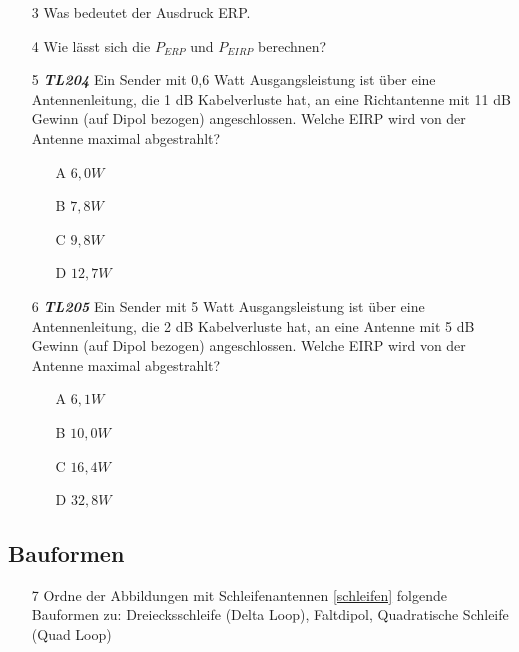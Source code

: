 \begin{enumerate} 
	\item[3] Was bedeutet der Ausdruck ERP.
	\item[4] Wie lässt sich die $P_{ERP}$ und $P_{EIRP}$ berechnen?
	\item[5] \emph{\textbf{TL204}}  Ein Sender mit 0,6 Watt Ausgangsleistung ist über eine Antennenleitung, die 1 dB Kabelverluste hat, an eine Richtantenne mit 11 dB Gewinn (auf Dipol bezogen) angeschlossen. Welche EIRP wird von der Antenne maximal abgestrahlt?
	\begin{enumerate}
	\itemsep1pt\parskip0pt
		\item[A] $6,0W$
		\item[B] $7,8W$
		\item[C] $9,8W$
		\item[D] $12,7W$
	\end{enumerate}
	\item[6] \emph{\textbf{TL205}}  Ein Sender mit 5 Watt Ausgangsleistung ist über eine Antennenleitung, die 2 dB Kabelverluste hat, an eine Antenne mit 5 dB Gewinn (auf Dipol bezogen) angeschlossen. Welche EIRP wird von der Antenne maximal abgestrahlt?
	\begin{enumerate}
	\itemsep1pt\parskip0pt
		\item[A] $6,1W$
		\item[B] $10,0W$
		\item[C] $16,4W$
		\item[D] $32,8W$
	\end{enumerate}
\end{enumerate}


\subsection*{Bauformen}

\begin{enumerate} 
\itemsep1pt\parskip0pt
\item[7] Ordne der Abbildungen mit Schleifenantennen \ref{schleifen} folgende Bauformen zu: Dreiecksschleife (Delta Loop), Faltdipol, Quadratische Schleife (Quad Loop)
\end{enumerate}

